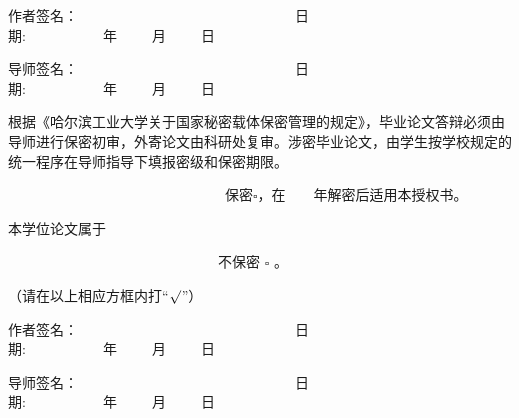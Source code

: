 \vspace{1.0cm}
\begin{flushright}{
作者签名：~~~~~~~~~~~~~~~~~~~~~~~~~~~~~~~日期:~~~~~~~~~~~年~~~~~月~~~~~日}
\end{flushright}
\vspace{0.2cm}
\begin{flushright}{
导师签名：~~~~~~~~~~~~~~~~~~~~~~~~~~~~~~~日期:~~~~~~~~~~~年~~~~~月~~~~~日}
\end{flushright}



\newpage



根据《哈尔滨工业大学关于国家秘密载体保密管理的规定》，毕业论文答辩必须由导师进行保密初审，外寄论文由科研处复审。涉密毕业论文，由学生按学校规定的统一程序在导师指导下填报密级和保密期限。

 \vspace{0.5cm}
~~~~~~~~~~~~~~~~~~~~~~~~~~~~~~~保密$\square$，在~~~~年解密后适用本授权书。

本学位论文属于

~~~~~~~~~~~~~~~~~~~~~~~~~~~~~~不保密 $\square$ 。

（请在以上相应方框内打“$\surd$”）
\vspace{1.0cm}

\begin{flushright}{
作者签名：~~~~~~~~~~~~~~~~~~~~~~~~~~~~~~~日期:~~~~~~~~~~~年~~~~~月~~~~~日}
\end{flushright} %
\begin{flushright}{
导师签名：~~~~~~~~~~~~~~~~~~~~~~~~~~~~~~~日期:~~~~~~~~~~~年~~~~~月~~~~~日}
\end{flushright}

\fi  %


